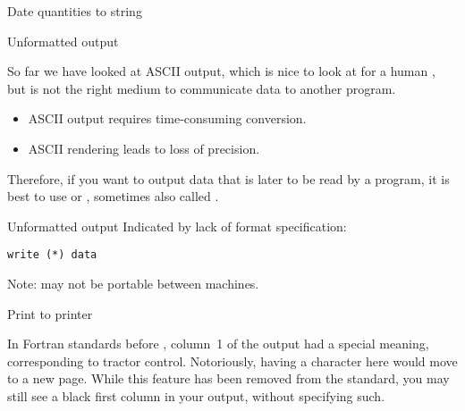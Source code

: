 \begin{block}{Date quantities to string}
  \label{sl:f-date-slash}
\end{block}

 {Unformatted output}
\label{sec:rawdataf}

So far we have looked at ASCII output, which is nice to look at for a
human , but is not the right medium to communicate data to another
program.
\begin{itemize}
\item ASCII output requires time-consuming conversion.
\item ASCII rendering leads to loss of precision.
\end{itemize}
Therefore, if you want to output data that is later to be read by a
program, it is best to use  or
, sometimes also called
.

\begin{block}{Unformatted output}
  Indicated by lack of format specification:
\begin{lstlisting}
write (*) data
\end{lstlisting}
  Note: may not be portable between machines.
\end{block}

 {Print to printer}

In Fortran standards before ,
  column~1 of the output had a special meaning,
  corresponding to  tractor control.
  Notoriously, having a character here would
  move to a new page.
  While this feature has been removed from the standard,
  you may still see a black first column in your output,
  without specifying such.


